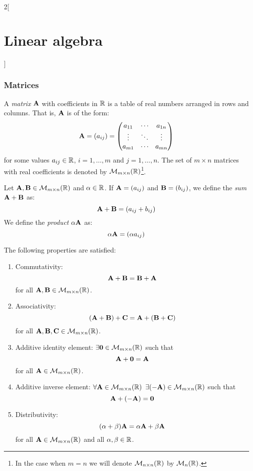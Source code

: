\documentclass[../../../main.tex]{subfiles}
\begin{document}
\begin{multicols}{2}[\section{Linear algebra}]
  \subsubsection{Matrices}
  \begin{definition}[Matrix]
    A \emph{matrix} $\boldsymbol{\mathrm{A}}$ with coefficients in $\mathbb{R}$ is a table of real numbers arranged in rows and columns. That is, $\boldsymbol{\mathrm{A}}$ is of the form:
    \begin{equation*}
      \boldsymbol{\mathrm{A}}=(a_{ij})=
      \begin{pmatrix}
        a_{11} & \cdots & a_{1n} \\
        \vdots & \ddots & \vdots \\
        a_{m1} & \cdots & a_{mn}
      \end{pmatrix}
    \end{equation*}
    for some values $a_{ij}\in\mathbb{R}$, $i=1,\ldots,m$ and $j=1,\ldots,n$. The set of $m\times n$ matrices with real coefficients is denoted by $\mathcal{M}_{m\times n}(\mathbb{R})$\footnote{In the case when $m=n$ we will denote $\mathcal{M}_{n\times n}(\mathbb{R})$ by $\mathcal{M}_n(\mathbb{R})$.}.
  \end{definition}
  \begin{definition}
    Let $\boldsymbol{\mathrm{A}},\boldsymbol{\mathrm{B}}\in\mathcal{M}_{m\times n}(\mathbb{R})$ and $\alpha\in\mathbb{R}$. If $\boldsymbol{\mathrm{A}}=(a_{ij})$ and $\boldsymbol{\mathrm{B}}=(b_{ij})$, we define the \emph{sum} $\boldsymbol{\mathrm{A}}+\boldsymbol{\mathrm{B}}$ as: $$\boldsymbol{\mathrm{A}}+\boldsymbol{\mathrm{B}}=(a_{ij}+b_{ij})$$
    We define the \emph{product} $\alpha\boldsymbol{\mathrm{A}}$ as: $$\alpha\boldsymbol{\mathrm{A}}=(\alpha a_{ij})$$
  \end{definition}
  \begin{proposition}
    The following properties are satisfied:
    \begin{enumerate}
      \item Commutativity: $$\boldsymbol{\mathrm{A}}+\boldsymbol{\mathrm{B}}=\boldsymbol{\mathrm{B}}+\boldsymbol{\mathrm{A}}$$ for all $\boldsymbol{\mathrm{A}},\boldsymbol{\mathrm{B}}\in\mathcal{M}_{m\times n}(\mathbb{R})$.
      \item Associativity: $$(\boldsymbol{\mathrm{A}}+\boldsymbol{\mathrm{B}})+\boldsymbol{\mathrm{C}}=\boldsymbol{\mathrm{A}}+(\boldsymbol{\mathrm{B}}+\boldsymbol{\mathrm{C}})$$ for all $\boldsymbol{\mathrm{A}},\boldsymbol{\mathrm{B}},\boldsymbol{\mathrm{C}}\in\mathcal{M}_{m\times n}(\mathbb{R})$.
      \item Additive identity element: $\exists\boldsymbol{\mathrm{0}}\in\mathcal{M}_{m\times n}(\mathbb{R})$ such that $$\boldsymbol{\mathrm{A}}+\boldsymbol{\mathrm{0}}=\boldsymbol{\mathrm{A}}$$ for all $\boldsymbol{\mathrm{A}}\in\mathcal{M}_{m\times n}(\mathbb{R})$.
      \item Additive inverse element: $\forall\boldsymbol{\mathrm{A}}\in\mathcal{M}_{m\times n}(\mathbb{R})$ $\exists(-\boldsymbol{\mathrm{A}})\in\mathcal{M}_{m\times n}(\mathbb{R})$ such that $$\boldsymbol{\mathrm{A}}+(-\boldsymbol{\mathrm{A}})=\boldsymbol{\mathrm{0}}$$
      \item Distributivity: $$(\alpha+\beta)\boldsymbol{\mathrm{A}}=\alpha\boldsymbol{\mathrm{A}}+\beta\boldsymbol{\mathrm{A}}$$ for all $\boldsymbol{\mathrm{A}}\in\mathcal{M}_{m\times n}(\mathbb{R})$ and all $\alpha,\beta\in\mathbb{R}$.

\end{enumerate}
\end{proposition}
\end{multicols}
\end{document}
